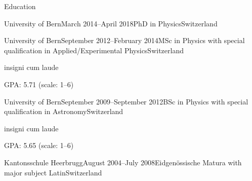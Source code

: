 \documentclass{resume} %
\begin{document}

\begin{rSection}{Education}
	\begin{nlSubsection}{University of Bern}{March 2014--April 2018}{PhD in Physics}{Switzerland}
	\end{nlSubsection}
	\begin{rSubsection}{University of Bern}{September 2012--February 2014}{MSc in Physics with special qualification in Applied/Experimental Physics}{Switzerland}
		\item insigni cum laude
		\item GPA: \num{5.71} (scale: \numrange{1}{6})
	\end{rSubsection}
	\begin{rSubsection}{University of Bern}{September 2009--September 2012}{BSc in Physics with special qualification in Astronomy}{Switzerland}
		\item insigni cum laude
		\item GPA: \num{5.65} (scale: \numrange{1}{6})
	\end{rSubsection}
	\begin{nlSubsection}{Kantonsschule Heerbrugg}{August 2004--July 2008}{Eidgenössische Matura with major subject Latin}{Switzerland}
	\end{nlSubsection}
\end{rSection}
\end{document}
